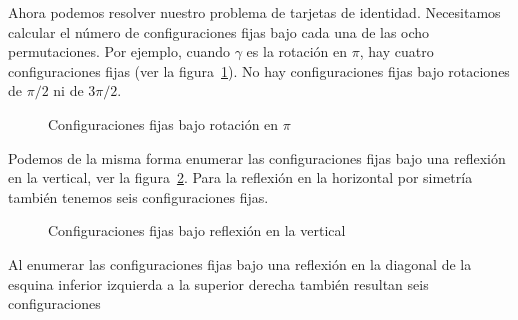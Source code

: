   Ahora podemos resolver nuestro problema de tarjetas de identidad.
  Necesitamos calcular el número de configuraciones fijas
  bajo cada una de las ocho permutaciones.
  Por ejemplo,
  cuando \(\gamma\) es la rotación en \(\pi\),
  hay cuatro configuraciones fijas
  (ver la figura~\ref{fig:tarjetas-fijas-180}).
  No hay configuraciones fijas bajo rotaciones de \(\pi / 2\)
  ni de \(3 \pi / 2\).
  \begin{figure}[htbp]
    \centering
    \hspace{2em}%
    \hspace{2em}%
    \hspace{2em}%
    \caption{Configuraciones fijas bajo rotación en $\pi$}
    \label{fig:tarjetas-fijas-180}
  \end{figure}
  Podemos de la misma forma enumerar las configuraciones fijas
  bajo una reflexión en la vertical,
  ver la figura~\ref{fig:tarjetas-fijas-vertical}.
  Para la reflexión en la horizontal por simetría
  también tenemos seis configuraciones fijas.
  \begin{figure}[htbp]
    \centering
    \hspace{2em}%
    \hspace{2em}%

    \hspace{2em}%
    \hspace{2em}%
    \caption{Configuraciones fijas bajo reflexión en la vertical}
    \label{fig:tarjetas-fijas-vertical}
  \end{figure}
  Al enumerar las configuraciones fijas
  bajo una reflexión en la diagonal de la esquina inferior izquierda
  a la superior derecha también resultan seis configuraciones
